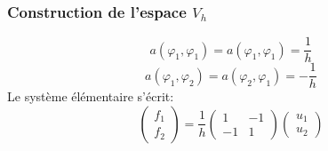 \documentclass{beamer}
\begin{document}
\begin{frame}
\frametitle{Construction de l'espace $V_h$}
\[a(\varphi_1,\varphi_1)=a(\varphi_1,\varphi_1)=\frac 1h\]
\[a(\varphi_1,\varphi_2)=a(\varphi_2,\varphi_1)=-\frac 1h\]
Le système élémentaire s'écrit:
\[\left(\begin{array}{r} 
f_{1}\\f_{2}
\end{array}\right)=\frac{1}{h}\left(\begin{array}{rr} 
1&-1\\-1&1
\end{array}\right) \left(\begin{array}{l} 
u_{1}\\u_{2}
\end{array}\right)
\]

\end{frame}
\end{document}
